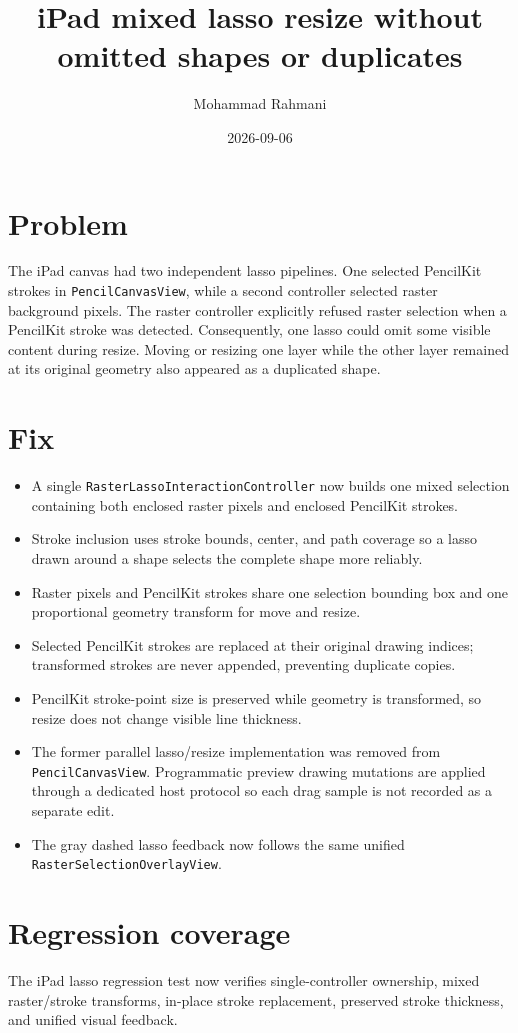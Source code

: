 \documentclass[a4paper]{article}
\title{iPad mixed lasso resize without omitted shapes or duplicates}
\date{2026-09-06}
\author{Mohammad Rahmani}
\begin{document}
\maketitle

\section{Problem}
The iPad canvas had two independent lasso pipelines. One selected PencilKit
strokes in \texttt{PencilCanvasView}, while a second controller selected raster
background pixels. The raster controller explicitly refused raster selection
when a PencilKit stroke was detected. Consequently, one lasso could omit some
visible content during resize. Moving or resizing one layer while the other
layer remained at its original geometry also appeared as a duplicated shape.

\section{Fix}
\begin{itemize}
   \item A single \texttt{RasterLassoInteractionController} now builds one
   mixed selection containing both enclosed raster pixels and enclosed
   PencilKit strokes.
   \item Stroke inclusion uses stroke bounds, center, and path coverage so a
   lasso drawn around a shape selects the complete shape more reliably.
   \item Raster pixels and PencilKit strokes share one selection bounding box
   and one proportional geometry transform for move and resize.
   \item Selected PencilKit strokes are replaced at their original drawing
   indices; transformed strokes are never appended, preventing duplicate
   copies.
   \item PencilKit stroke-point size is preserved while geometry is
   transformed, so resize does not change visible line thickness.
   \item The former parallel lasso/resize implementation was removed from
   \texttt{PencilCanvasView}. Programmatic preview drawing mutations are
   applied through a dedicated host protocol so each drag sample is not
   recorded as a separate edit.
   \item The gray dashed lasso feedback now follows the same unified
   \texttt{RasterSelectionOverlayView}.
\end{itemize}

\section{Regression coverage}
The iPad lasso regression test now verifies single-controller ownership,
mixed raster/stroke transforms, in-place stroke replacement, preserved stroke
thickness, and unified visual feedback.
\end{document}
